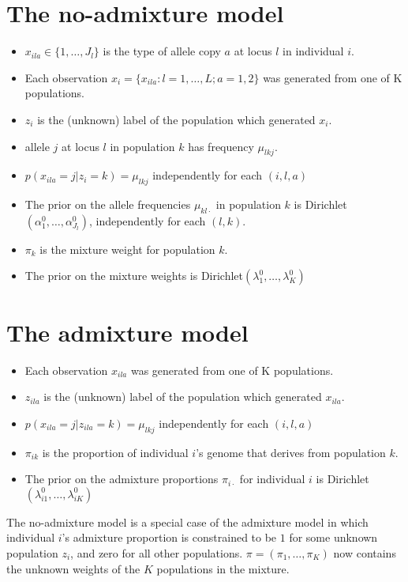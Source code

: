 \documentclass[12pt,a4paper,reqno]{article}
\newcommand{\(}{\left(}
\newcommand{\)}{\right)}
\newcommand{\|}{\arrowvert}
\begin{document}
\section{The no-admixture model}
\begin{itemize}
\item $x_{ila} \in \{1,\ldots, J_{l}\}$ is the type of allele copy $a$ at locus $l$ in individual $i$.
\item Each observation $x_{i}=\{x_{ila}:l=1,\ldots,L;a=1,2\}$ was generated from one of K populations.
\item $z_{i}$ is the (unknown) label of the population which generated $x_{i}$.
\item allele $j$ at locus $l$ in population $k$ has frequency $\mu_{lkj}$.
\item $p(x_{ila} = j | z_{i}=k) = \mu_{lkj}$ independently for each $(i,l,a)$
\item The prior on the allele frequencies $\mu_{kl\cdot}$ in population $k$ is Dirichlet$(\alpha^{0}_{1},\ldots,\alpha^{0}_{J_{l}})$, independently for each $(l,k)$.
\item $\pi_{k}$ is the mixture weight for population $k$.
\item The prior on the mixture weights is Dirichlet$(\lambda^{0}_{1},\ldots,\lambda^{0}_{K})$
\end{itemize}

\section{The admixture model}

\begin{itemize}
\item Each observation $x_{ila}$ was generated from one of K populations.
\item $z_{ila}$ is the (unknown) label of the population which generated $x_{ila}$.
\item $p(x_{ila} = j | z_{ila}=k) = \mu_{lkj}$ independently for each $(i,l,a)$
\item $\pi_{ik}$ is the proportion of individual $i$'s genome that derives from population $k$.
\item The prior on the admixture proportions $\pi_{i\cdot}$ for individual $i$ is Dirichlet $(\lambda^{0}_{i1},\ldots,\lambda^{0}_{iK})$
\end{itemize}
The no-admixture model is a special case of the admixture model in which individual $i$'s admixture proportion is constrained to be $1$ for some unknown population $z_{i}$, and zero for all other populations. $\pi = (\pi_{1},\ldots, \pi_{K})$ now contains the unknown weights of the $K$ populations in the mixture.  
\end{document}
